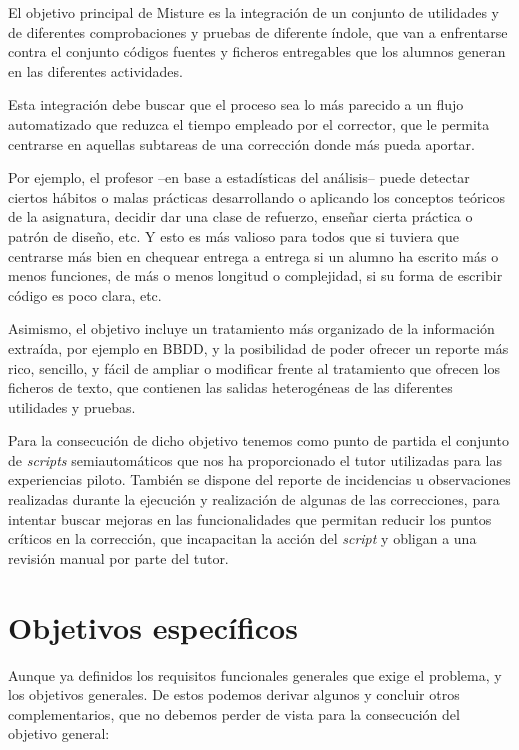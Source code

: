 El objetivo principal de Misture es la integración de un conjunto de utilidades y de diferentes comprobaciones y pruebas de diferente índole, que van a enfrentarse contra el conjunto códigos fuentes y ficheros entregables que los alumnos generan en las diferentes actividades.


Esta integración debe buscar que el proceso sea lo más parecido a un flujo automatizado que reduzca el tiempo empleado por el corrector, que le permita centrarse en aquellas subtareas de una corrección donde más pueda aportar.


Por ejemplo, el profesor --en base a estadísticas del análisis-- puede detectar ciertos hábitos o malas prácticas desarrollando o aplicando los conceptos teóricos de la asignatura, decidir dar una clase de refuerzo, enseñar cierta práctica o patrón de diseño, etc. Y esto es más valioso para todos que si tuviera que centrarse más bien en chequear entrega a entrega si un alumno ha escrito más o menos funciones, de más o menos longitud o complejidad, si su forma de escribir código es poco clara, etc.


Asimismo, el objetivo incluye un tratamiento más organizado de la información extraída, por ejemplo en BBDD, y la posibilidad de poder ofrecer un reporte más rico, sencillo, y fácil de ampliar o modificar frente al tratamiento que ofrecen los ficheros de texto, que contienen las salidas heterogéneas de las diferentes utilidades y pruebas.


Para la consecución de dicho objetivo tenemos como punto de partida el conjunto de \textit{scripts} semiautomáticos que nos ha proporcionado el tutor utilizadas para las experiencias piloto. También se dispone del reporte de incidencias u observaciones realizadas durante la ejecución y realización de algunas de las correcciones, para intentar buscar mejoras en las funcionalidades que permitan reducir los puntos críticos en la corrección, que incapacitan la acción del \textit{script} y obligan a una revisión manual por parte del tutor. 


\section{Objetivos específicos}
\label{sec:obj_esp}


Aunque ya definidos los requisitos funcionales generales que exige el problema, y los objetivos generales. De estos podemos derivar algunos y concluir otros complementarios, que no debemos perder de vista para la consecución del objetivo general:


